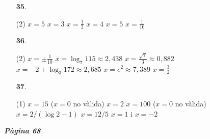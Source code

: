 \documentclass[a4paper, pdf, twoside]{book}
\begin{document}
\begin{multicols}{2}
\begin{enumerate}

 \item[\fontfamily{phv}\selectfont\color{blue}\textbf{35}. ] 
 \begin{tasks}[column-sep=1em, item-indent=1.3333em](2)
	 \task $x=5$
	 \task $x=3$
	 \task $x=\frac {1}{2}$
	 \task $x=4$
	 \task $x=5$
	 \task $x=\frac {1}{16}$
\end{tasks}
 \end{enumerate}
\begin{enumerate}
\vspace{0.25cm}



 \item[\fontfamily{phv}\selectfont\color{blue}\textbf{36}. ] 
 \begin{tasks}[column-sep=1em, item-indent=1.3333em](2)
	 \task $x=\pm \frac {1}{10}$
	 \task $x=\log _7 115\approx 2,438$
	 \task* $x=\frac {\sqrt {7}}{3}\approx 0,882$
	 \task* $x=-2+\log _3 172\approx 2,685$
	 \task $x=e^2\approx 7,389$
	 \task $x=\frac {3}{2}$
\end{tasks}
\vspace{0.25cm}



 \item[\fontfamily{phv}\selectfont\color{blue}\textbf{37}. ]  \scalebox{0.6}{\simbolclau } 
 \begin{tasks}[column-sep=1em, item-indent=1.3333em](1)
	 \task $x=15$ ($x=0$ no vàlida)
	 \task $x=2$
	 \task $x=100$ ($x=0$ no vàlida)
	 \task $x=2/(\log 2 - 1)$
	 \task $x=12/5$
	 \task $x=1$ i $x=-2$
\end{tasks}
 \end{enumerate}
\vspace{0.3cm}


{\textbf{\em Pàgina 68}} \hrulefill
\begin{enumerate}
\vspace{0.25cm}




\end{enumerate}
\end{multicols}
\end{document}
